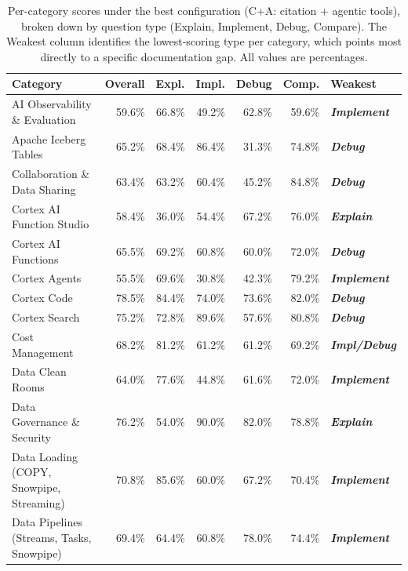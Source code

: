 \documentclass[10pt,letterpaper]{article}
\begin{document}
\begin{table}[tbp]
\centering
\caption{Per-category scores under the best configuration (C+A: citation + agentic tools), broken down by question type (Explain, Implement, Debug, Compare). The Weakest column identifies the lowest-scoring type per category, which points most directly to a specific documentation gap. All values are percentages.}
\label{tab:category_intelligence}
\small
\begin{tabularx}{\linewidth}{@{}X r r r r r l@{}}
\toprule
\textbf{Category} & \textbf{Overall} & \textbf{Expl.} & \textbf{Impl.} & \textbf{Debug} & \textbf{Comp.} & \textbf{Weakest} \\
\midrule
AI Observability \& Evaluation          & 59.6\% & 66.8\% & 49.2\% & 62.8\% & 59.6\% & \textbf{\textit{Implement}} \\
Apache Iceberg Tables                   & 65.2\% & 68.4\% & 86.4\% & 31.3\% & 74.8\% & \textbf{\textit{Debug}} \\
Collaboration \& Data Sharing           & 63.4\% & 63.2\% & 60.4\% & 45.2\% & 84.8\% & \textbf{\textit{Debug}} \\
Cortex AI Function Studio               & 58.4\% & 36.0\% & 54.4\% & 67.2\% & 76.0\% & \textbf{\textit{Explain}} \\
Cortex AI Functions                     & 65.5\% & 69.2\% & 60.8\% & 60.0\% & 72.0\% & \textbf{\textit{Debug}} \\
Cortex Agents                           & 55.5\% & 69.6\% & 30.8\% & 42.3\% & 79.2\% & \textbf{\textit{Implement}} \\
Cortex Code                             & 78.5\% & 84.4\% & 74.0\% & 73.6\% & 82.0\% & \textbf{\textit{Debug}} \\
Cortex Search                           & 75.2\% & 72.8\% & 89.6\% & 57.6\% & 80.8\% & \textbf{\textit{Debug}} \\
Cost Management                         & 68.2\% & 81.2\% & 61.2\% & 61.2\% & 69.2\% & \textbf{\textit{Impl/Debug}} \\
Data Clean Rooms                        & 64.0\% & 77.6\% & 44.8\% & 61.6\% & 72.0\% & \textbf{\textit{Implement}} \\
Data Governance \& Security             & 76.2\% & 54.0\% & 90.0\% & 82.0\% & 78.8\% & \textbf{\textit{Explain}} \\
Data Loading (COPY, Snowpipe, Streaming)& 70.8\% & 85.6\% & 60.0\% & 67.2\% & 70.4\% & \textbf{\textit{Implement}} \\
Data Pipelines (Streams, Tasks, Snowpipe)& 69.4\% & 64.4\% & 60.8\% & 78.0\% & 74.4\% & \textbf{\textit{Implement}} \\

\end{tabularx}
\end{table}
\end{document}
